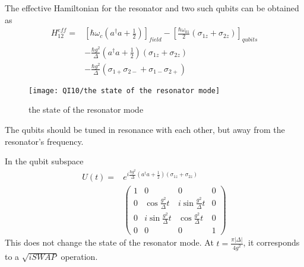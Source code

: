 The effective Hamiltonian for the resonator and two such qubits can be obtained as
\begin{align*}
    H_{12}^{eff}=&\left[ \hbar\omega_c\left( a^\dagger a +\frac{1}{2}\right) \right]_{field}-\left[ \frac{\hbar\omega_{01}}{2}(\sigma_{1z}+\sigma_{2z}) \right]_{qubits}\\
    &-\frac{\hbar g^2}{\Delta}\left( a^\dagger a+\frac{1}{2} \right)(\sigma_{1z}+\sigma_{2z})\\
    &-\frac{\hbar g^2}{\Delta}(\sigma_{1+}\sigma_{2-}+\sigma_{1-}\sigma_{2+})
\end{align*}

\begin{figure}[!htb]
    \centering
    \texttt{[image: QI10/the state of the resonator mode]}
    \caption{ the state of the resonator mode}
\end{figure}

The qubits should be tuned in resonance with each other, but away from the resonator's frequency.

In the qubit subspace
\begin{align*}
    U(t)=&e^{i\frac{\hbar g^2}{\Delta}\left( a^\dagger a+\frac{1}{2} \right)(\sigma_{1z}+\sigma_{2z})}\\
    &\begin{pmatrix}
        1 & 0 & 0 & 0\\
        0 & \cos\frac{g^2}{\Delta}t & i\sin \frac{g^2}{\Delta}t & 0\\
        0 & i\sin \frac{g^2}{\Delta}t & \cos \frac{g^2}{\Delta}t& 0\\
        0 & 0 & 0 & 1
    \end{pmatrix}
\end{align*}
This does not change the state of the resonator mode. At $t=\frac{\pi |\Delta|}{4g^2}$, it corresponds to a $\sqrt{i SWAP}$ operation.


